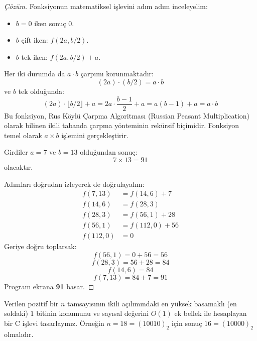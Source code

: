 \begin{proof}[Çözüm]
Fonksiyonun matematiksel işlevini adım adım inceleyelim:
\begin{itemize}
    \item $b = 0$ iken sonuç $0$.
    \item $b$ çift iken: $f(2a, b/2)$.
    \item $b$ tek iken: $f(2a, b/2) + a$.
\end{itemize}

Her iki durumda da $a \cdot b$ çarpımı korunmaktadır:
\[
(2a) \cdot (b/2) = a \cdot b
\]
ve $b$ tek olduğunda:
\[
(2a) \cdot \lfloor b/2 \rfloor + a = 2a \cdot \frac{b-1}{2} + a = a(b-1) + a = a \cdot b
\]
Bu fonksiyon, Rus Köylü Çarpma Algoritması (Russian Peasant Multiplication) olarak bilinen ikili tabanda çarpma yönteminin rekürsif biçimidir. Fonksiyon temel olarak $a \times b$ işlemini gerçekleştirir.

Girdiler $a = 7$ ve $b = 13$ olduğundan sonuç:
\[
7 \times 13 = 91
\]
olacaktır.

Adımları doğrudan izleyerek de doğrulayalım:
\begin{align*}
f(7, 13) &= f(14, 6) + 7 \\
f(14, 6) &= f(28, 3) \\
f(28, 3) &= f(56, 1) + 28 \\
f(56, 1) &= f(112, 0) + 56 \\
f(112, 0) &= 0
\end{align*}
Geriye doğru toplarsak:
\[
f(56, 1) = 0 + 56 = 56
\]
\[
f(28, 3) = 56 + 28 = 84
\]
\[
f(14, 6) = 84
\]
\[
f(7, 13) = 84 + 7 = 91
\]
Program ekrana \textbf{91} basar.
\end{proof}

\begin{example}
Verilen pozitif bir $n$ tamsayısının ikili açılımındaki en yüksek basamaklı (en soldaki) $1$ bitinin konumunu ve sayısal değerini $O(1)$ ek bellek ile hesaplayan bir C işlevi tasarlayınız. Örneğin $n = 18 = (10010)_2$ için sonuç $16 = (10000)_2$ olmalıdır.
\end{example}

